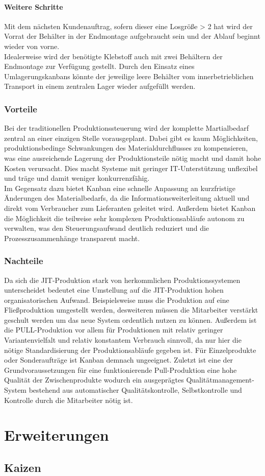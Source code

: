 \documentclass[00_ToyotaProduktionssystem.tex]{subfiles}
\begin{document}
\paragraph{Weitere Schritte}
Mit dem nächsten Kundenauftrag, sofern dieser eine Losgröße > 2 hat wird der Vorrat der Behälter in der Endmontage aufgebraucht sein und der Ablauf beginnt wieder von vorne.\\
Idealerweise wird der benötigte Klebstoff auch mit zwei Behältern der Endmontage zur Verfügung gestellt. Durch den Einsatz eines Umlagerungskanbans könnte der jeweilige leere Behälter vom innerbetrieblichen Transport in einem zentralen Lager wieder aufgefüllt werden.

\subsubsection{Vorteile}
Bei der traditionellen Produktionssteuerung wird der komplette Martialbedarf zentral an einer einzigen Stelle vorausgeplant. Dabei gibt es kaum Möglichkeiten, produktionsbedinge Schwankungen des Materialdurchflusses zu kompensieren, was eine ausreichende Lagerung der Produktionsteile nötig macht und damit hohe Kosten verursacht. Dies macht Systeme mit geringer IT-Unterstützung unflexibel und träge und damit weniger konkurrenzfähig.\\
Im Gegensatz dazu bietet Kanban eine schnelle Anpassung an kurzfristige Änderungen des Materialbedarfs, da die Informationsweiterleitung aktuell und direkt vom Verbraucher zum Lieferanten geleitet wird. Außerdem bietet Kanban die Möglichkeit die teilweise sehr komplexen Produktionsabläufe autonom zu verwalten, was den Steuerungsaufwand deutlich reduziert und die Prozesszusammenhänge transparent macht.
\subsubsection{Nachteile}
Da sich die JIT-Produktion stark von herkommlichen Produktionssystemen unterscheidet bedeutet eine Umstellung auf die JIT-Produktion hohen organisatorischen Aufwand. Beispielsweise muss die Produktion auf eine Fließproduktion umgestellt werden, desweiteren müssen die Mitarbeiter verstärkt geschult werden um das neue System ordentlich nutzen zu können. Außerdem ist die PULL-Produktion vor allem für Produktionen mit relativ geringer Variantenvielfalt und relativ konstantem Verbrauch sinnvoll, da nur hier die nötige Standardisierung der Produktionsabläufe gegeben ist. Für Einzelprodukte oder Sonderaufträge ist Kanban demnach ungeeignet. Zuletzt ist eine der Grundvoraussetzungen für eine funktionierende Pull-Produktion eine hohe Qualität der Zwischenprodukte wodurch ein ausgeprägtes Qualitätmanagement-System bestehend aus automatischer Qualitätskontrolle, Selbstkontrolle und Kontrolle durch die Mitarbeiter nötig ist.
\section{Erweiterungen}

\subsection{Kaizen}
\end{document}

